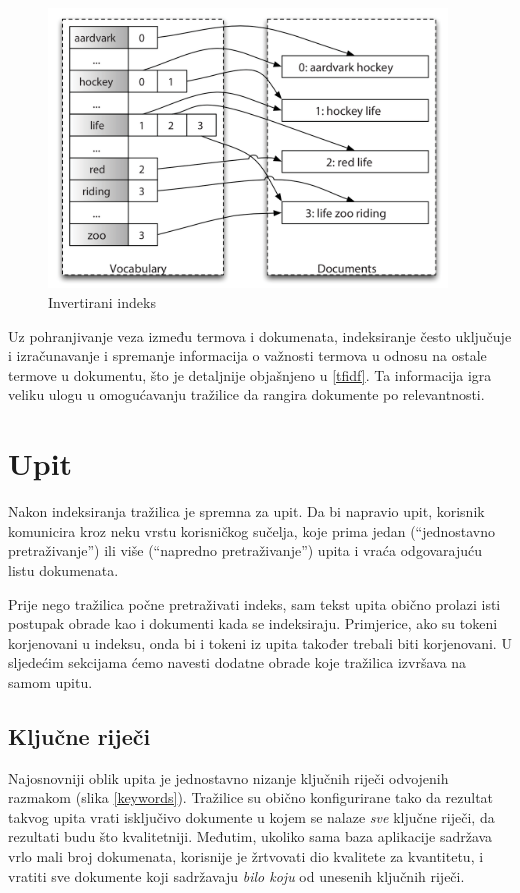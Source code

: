 \documentclass[a4paper,twoside,12pt]{scrreprt}
\begin{document}
\begin{figure}[H]
  \centering
  \includegraphics[width=300pt]{inverted_index}
  \caption{Invertirani indeks}
  \label{inverted_index}
\end{figure}

Uz pohranjivanje veza između termova i dokumenata, indeksiranje često uključuje i izračunavanje i spremanje informacija o važnosti termova u odnosu na ostale termove u dokumentu, što je detaljnije objašnjeno u \ref{tfidf}. Ta informacija igra veliku ulogu u omogućavanju tražilice da rangira dokumente po relevantnosti.

\section{Upit}

Nakon indeksiranja tražilica je spremna za upit. Da bi napravio upit, korisnik komunicira kroz neku vrstu korisničkog sučelja, koje prima jedan (``jednostavno pretraživanje'') ili više (``napredno pretraživanje'') upita i vraća odgovarajuću listu dokumenata.

Prije nego tražilica počne pretraživati indeks, sam tekst upita obično prolazi isti postupak obrade kao i dokumenti kada se indeksiraju. Primjerice, ako su tokeni korjenovani u indeksu, onda bi i tokeni iz upita također trebali biti korjenovani. U sljedećim sekcijama ćemo navesti dodatne obrade koje tražilica izvršava na samom upitu.

\subsection{Ključne riječi}

Najosnovniji oblik upita je jednostavno nizanje ključnih riječi odvojenih razmakom (slika \ref{keywords}). Tražilice su obično konfigurirane tako da rezultat takvog upita vrati isključivo dokumente u kojem se nalaze \textit{sve} ključne riječi, da rezultati budu što kvalitetniji. Međutim, ukoliko sama baza aplikacije sadržava vrlo mali broj dokumenata, korisnije je žrtvovati dio kvalitete za kvantitetu, i vratiti sve dokumente koji sadržavaju \textit{bilo koju} od unesenih ključnih riječi.
\end{document}
